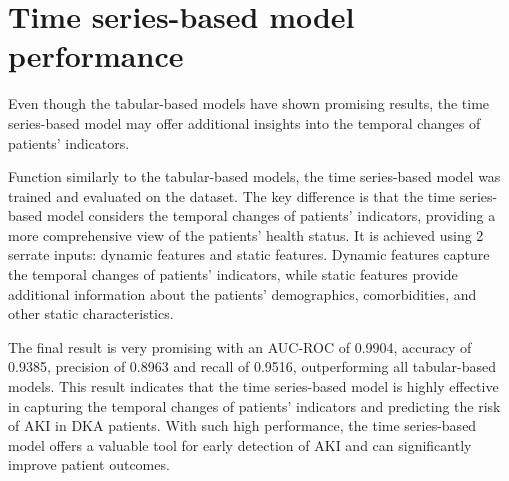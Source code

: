 \documentclass[../main.tex]{subfiles}
\begin{document}
\section{Time series-based model performance}

Even though the tabular-based models have shown promising results, the time series-based model may offer additional insights into the temporal changes of patients' indicators.

Function similarly to the tabular-based models, the time series-based model was trained and evaluated on the dataset.
The key difference is that the time series-based model considers the temporal changes of patients' indicators, providing a more comprehensive view of the patients' health status.
It is achieved using 2 serrate inputs: dynamic features and static features.
Dynamic features capture the temporal changes of patients' indicators, while static features provide additional information about the patients' demographics, comorbidities, and other static characteristics.

The final result is very promising with an AUC-ROC of 0.9904, accuracy of 0.9385, precision of 0.8963 and recall of 0.9516, outperforming all tabular-based models.
This result indicates that the time series-based model is highly effective in capturing the temporal changes of patients' indicators and predicting the risk of AKI in DKA patients.
With such high performance, the time series-based model offers a valuable tool for early detection of AKI and can significantly improve patient outcomes.
\end{document}
